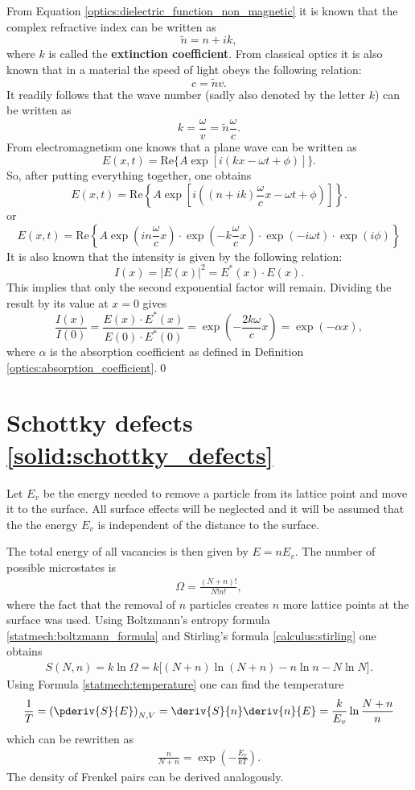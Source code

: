    From Equation \eqref{optics:dielectric_function_non_magnetic} it is known that the complex refractive index can be written as \[\widetilde{n} = n+ik,\] where $k$ is called the \textbf{extinction coefficient}. From classical optics it is also known that in a material the speed of light obeys the following relation: \[c = \widetilde{n}v.\] It readily follows that the wave number (sadly also denoted by the letter $k$) can be written as \[k = \frac{\omega}{v} = \widetilde{n}\frac{\omega}{c}.\] From electromagnetism one knows that a plane wave can be written as \[E(x,t) = \mathrm{Re}\big\{A\exp\left[i(kx - \omega t + \phi)\right]\big\}.\] So, after putting everything together, one obtains \[E(x,t) = \mathrm{Re}\left\{A\exp\left[i\left((n+ik)\frac{\omega}{c}x - \omega t + \phi\right)\right]\right\}.\] or \[E(x,t) = \mathrm{Re}\left\{A\exp\left(in\frac{\omega}{c}x\right)\cdot\exp\left(-k\frac{\omega}{c}x\right)\cdot\exp\left(-i\omega t\right)\cdot\exp\left(i\phi\right)\right\}\] It is also known that the intensity is given by the following relation:\[I(x) = |E(x)|^2 = E^*(x)\cdot E(x).\] This implies that only the second exponential factor will remain. Dividing the result by its value at $x=0$ gives \[\frac{I(x)}{I(0)} = \frac{E(x)\cdot E^*(x)}{E(0)\cdot E^*(0)} = \exp\left(-\frac{2k\omega}{c}x\right) = \exp(-\alpha x),\]
    where $\alpha$ is the absorption coefficient as defined in Definition \ref{optics:absorption_coefficient}.\qed

\section{Schottky defects \ref{solid:schottky_defects}}\label{deriv:schottky_defects}

    Let $E_v$ be the energy needed to remove a particle from its lattice point and move it to the surface. All surface effects will be neglected and it will be assumed that the the energy $E_v$ is independent of the distance to the surface.

    The total energy of all vacancies is then given by $E = nE_v$. The number of possible microstates is
    \begin{gather}
        \Omega = \frac{(N+n)!}{N!n!},
    \end{gather}
    where the fact that the removal of $n$ particles creates $n$ more lattice points at the surface was used. Using Boltzmann's entropy formula \eqref{statmech:boltzmann_formula} and Stirling's formula \ref{calculus:stirling} one obtains
    \begin{gather}
        S(N,n) = k\ln\Omega = k\big[(N+n)\ln(N+n) -n\ln n - N\ln N \big].
    \end{gather}
    Using Formula \ref{statmech:temperature} one can find the temperature
    \begin{gather}
        \frac{1}{T} = \left(\pderiv{S}{E}\right)_{N, V} = \deriv{S}{n}\deriv{n}{E} = \frac{k}{E_v}\ln\frac{N+n}{n}
    \end{gather}
    which can be rewritten as
    \begin{gather}
        \frac{n}{N + n} = \exp\left(-\frac{E_v}{kT}\right).
    \end{gather}
    The density of Frenkel pairs can be derived analogously.